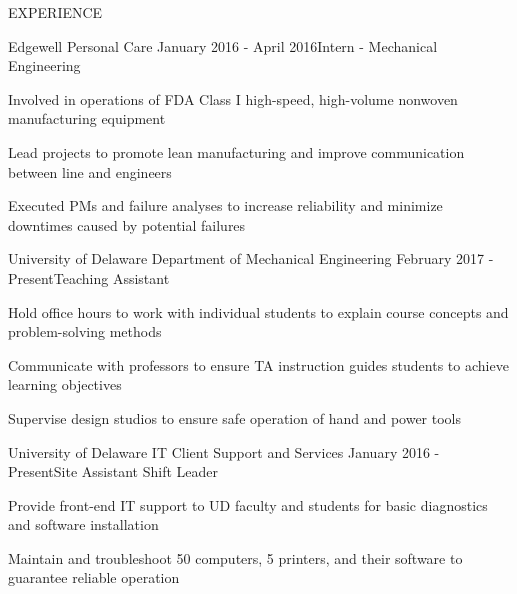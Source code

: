 \documentclass{resume} %
\begin{document}
\begin{rSection}{EXPERIENCE}

\begin{rSubsection}{Edgewell Personal Care} {January 2016 - April 2016}{Intern - Mechanical Engineering}{}

\item Involved in operations of FDA Class I high-speed, high-volume nonwoven manufacturing equipment
\item Lead projects to promote lean manufacturing and improve communication between line and engineers
\item Executed PMs and failure analyses to increase reliability and minimize downtimes caused by potential failures
 
\end{rSubsection}  


\begin{rSubsection}{University of Delaware Department of Mechanical Engineering} {February 2017 - Present}{Teaching Assistant}{}

\item Hold office hours to work with individual students to explain course concepts and problem-solving methods
\item Communicate with professors to ensure TA instruction guides students to achieve learning objectives
\item Supervise design studios to ensure safe operation of hand and power tools
 
\end{rSubsection}  


\begin{rSubsection}{University of Delaware IT Client Support and Services} {January 2016 - Present}{Site Assistant Shift Leader}{}

\item Provide front-end IT support to UD faculty and students for basic diagnostics and software installation
\item Maintain and troubleshoot 50 computers, 5 printers, and their software to guarantee reliable operation
 
\end{rSubsection}  

\end{rSection} 
 
\end{document}
